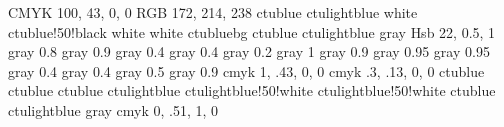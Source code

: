  {
	\definecolor { ctublue } { CMYK } { 100, 43, 0, 0 }
	\definecolor { ctulightblue } { RGB }{ 172, 214, 238 }
	 { ctublue }
	 { ctulightblue }
	 { white }
	 { ctublue!50!black }
	 { white }%
	 { white }
	 { ctubluebg }
	 { ctublue }
	 { ctulightblue }
	 { gray }
	\definecolor { ctuorange } { Hsb } { 22, 0.5, 1 }
} {
	 {
		\definecolor { ctublue } { gray } { 0.8 }
		\definecolor { ctulightblue } { gray } { 0.9 }
		\definecolor { ctubluetext } { gray } { 0.4 }
		\definecolor { ctubluerule } { gray } { 0.4 }
		\definecolor { ctubluedarkbg } { gray } { 0.2 }
		\definecolor { ctubluedarkfg } { gray } { 1 }
		\definecolor { ctubluedot } { gray } { 0.9 }
		\definecolor { ctubluebg } { gray } { 0.95 }
		\definecolor { ctulstbg } { gray } { 0.95 }
		\definecolor { ctublueitemi } { gray } { 0.4 }
		\definecolor { ctublueitemii } { gray } { 0.4 }
		\definecolor { ctugray } { gray } { 0.5 }
		\definecolor { ctuorange } { gray } { 0.9 }
	} {
		\definecolor { ctublue } { cmyk } { 1, .43, 0, 0 }
		\definecolor { ctulightblue } { cmyk }{ .3, .13, 0, 0 }
		 { ctublue }
		 { ctublue }
		 { ctublue }
		 { ctulightblue }
		 { ctulightblue!50!white }
		 { ctulightblue!50!white }
		 { ctublue }
		 { ctulightblue }
		 { gray }
		\definecolor { ctuorange } { cmyk } { 0, .51, 1, 0 }
	}
}

\setlength{\parskip}{0pt plus 1pt}

\setlength{\parindent}{11.2pt}







